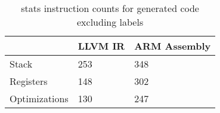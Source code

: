 \begin{table}[h!]
\centering
\begin{tabular}{p{}p{}p{}}
  \hline
 & LLVM IR & ARM Assembly \\ 
  \hline
Stack & 253 & 348 \\ 
  Registers & 148 & 302 \\ 
  Optimizations & 130 & 247 \\ 
   \hline
\end{tabular}
\caption{stats instruction counts for generated code excluding labels}
\end{table}
